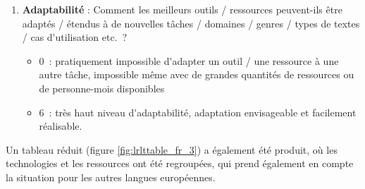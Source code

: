 \begin{french}
\begin{multicols}{2}
\begin{enumerate}
\item {\bf Adaptabilité} : Comment les meilleurs outils / ressources peuvent-ils être adaptés / étendus à de nouvelles tâches / domaines / genres / types de textes / cas d{\mbox '}utilisation etc.~? 
\begin{itemize}
      \item 0~: pratiquement impossible d{\mbox '}adapter un outil / une ressource à une autre tâche, impossible même avec de grandes quantités de ressources ou de personne-mois disponibles
      \item 6~: très haut niveau d{\mbox '}adaptabilité, adaptation envisageable et facilement réalisable.
      \end{itemize}
\end{enumerate}


Un tableau réduit (figure \ref{fig:lrlttable_fr_3}) a également été produit, où les technologies et les
ressources ont été regroupées, qui prend également en compte la
situation pour les autres langues européennes.


\end{multicols}
\end{french}
